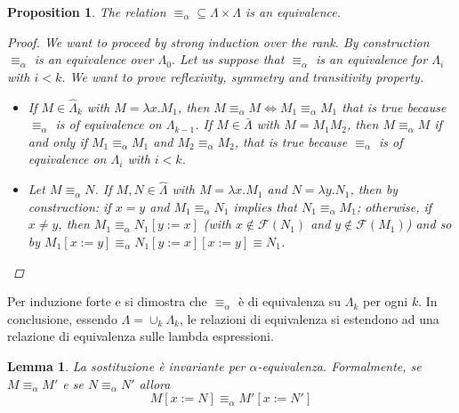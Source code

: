 \documentclass[a4paper,11pt]{article}
\newtheorem{lemma}{Lemma}
\newtheorem{prop}{Proposition}
\theoremstyle{definition}
\newcommand{\FF}{\mathcal{F}}
\begin{document}
\begin{prop}
  The relation $\equiv_\alpha \subseteq \Lambda\times\Lambda$ is an
  equivalence.
  \begin{proof}
    We want to proceed by strong induction over the rank.
    By construction $\equiv_\alpha$ is an equivalence over $\Lambda_0$. Let
    us suppose that $\equiv_\alpha$ is an equivalence for $\Lambda_i$ with
    $i<k$. We want to prove \textit{reflexivity, symmetry and transitivity} property.
    \begin{itemize}
      \item[Reflex.] If $M\in\hat\Lambda_k$ with $M=\lambda x.M_1$, then
        $M\equiv_\alpha M\iff M_1\equiv_\alpha M_1$ that is true because
        $\equiv_\alpha$ is of equivalence on $\Lambda_{k-1}$. If
        $M\in\bar\Lambda$ with $M=M_1M_2$, then $M\equiv_\alpha M$ if and only 
        if $M_1\equiv_\alpha M_1$ and $M_2\equiv_\alpha M_2$, that is true 
        because $\equiv_\alpha$ is of equivalence on $\Lambda_i$ with $i<k$. 
      \item[Symmet.]
        Let $M\equiv_\alpha N$. If $M,N\in\hat\Lambda$ with $M=\lambda x.M_1$
        and $N=\lambda y.N_1$, then by construction: if $x=y$ and $M_1\equiv_\alpha
        N_1$ implies that $N_1\equiv_\alpha M_1$; otherwise, if $x\ne y$,
        then $M_1\equiv_\alpha N_1[y:=x]$ (with $x\not\in\FF(N_1)$ and
        $y\not\in\FF(M_1)$) and so by  $M_1[x:=y]\equiv_\alpha
        N_1[y:=x][x:=y]\equiv N_1$.
    \end{itemize}
  \end{proof}
\end{prop}


  Per induzione forte e  si dimostra che $\equiv_\alpha$ è di equivalenza
  su $\Lambda_k$ per ogni $k$. In conclusione, essendo $\Lambda=\cup_k \Lambda_k$, 
  le relazioni di equivalenza si estendono ad una relazione di equivalenza 
  sulle lambda espressioni.
\begin{lemma}
  La sostituzione è invariante per $\alpha$-equivalenza. Formalmente, se
  $M\equiv_\alpha M'$ e se $N\equiv_\alpha N'$ allora
  \[
    M[x:= N] \equiv_\alpha M'[x:=N']
  \]
\end{lemma}
\end{document}
